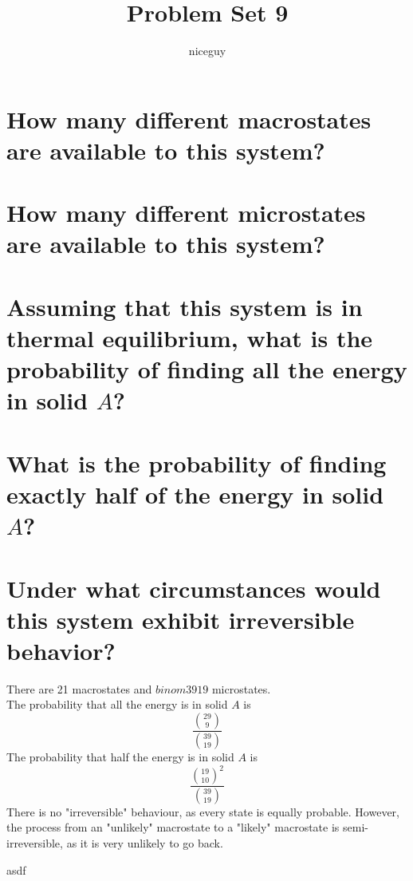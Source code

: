 \documentclass[answers]{exam}
\author{niceguy}
\title{Problem Set 9}
\begin{document}
\maketitle

\begin{questions}


\begin{parts}
	\part{How many different macrostates are available to this system?}
	\part{How many different microstates are available to this system?}
	\part{Assuming that this system is in thermal equilibrium, what is the probability of finding all the energy in solid $A$?}
	\part{What is the probability of finding exactly half of the energy in solid $A$?}
	\part{Under what circumstances would this system exhibit irreversible behavior?}
\end{parts}

\begin{solution}
	There are 21 macrostates and $binom{39}{19}$ microstates. \\
	The probability that all the energy is in solid $A$ is
	$$\frac{\binom{29}{9}}{\binom{39}{19}}$$
	The probability that half the energy is in solid $A$ is
	$$\frac{\binom{19}{10}^2}{\binom{39}{19}}$$
	There is no "irreversible" behaviour, as every state is equally probable. However, the process from an "unlikely" macrostate to a "likely" macrostate is semi-irreversible, as it is very unlikely to go back.
\end{solution}


\begin{solution}
	asdf
\end{solution}

\end{questions}
\end{document}
